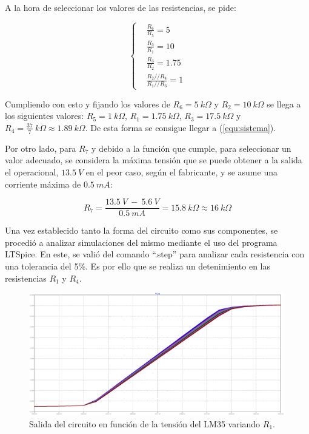A la hora de seleccionar los valores de las resistencias, se pide:

\begin{equation*}
\left\{
\begin{aligned}
  		&	\frac{R_6}{R_5} = 5	\\
  		&	\frac{R_3}{R_1} = 10	\\
  		&	\frac{R_3}{R_2} = 1.75	\\
  		&	\frac{R_2 // R_4}{R_1 // R_3} = 1
\end{aligned}
\right.
\end{equation*}

Cumpliendo con esto y fijando los valores de $R_6 = 5 \ k\Omega$ y $R_2 = 10 \ k\Omega$ se llega a los siguientes valores: $R_5 = 1 \ k\Omega$, $R_1 = 1.75 \ k\Omega$, $R_3 = 17.5 \ k\Omega$ y $R_4 = \frac{37}{7} \ k\Omega \approx 1.89 \ k\Omega$. De esta forma se consigue llegar a (\ref{equ:sistema}).

Por otro lado, para $R_7$ y debido a la función que cumple, para seleccionar un valor adecuado, se considera la máxima tensión que se puede obtener a la salida el operacional, $13.5 \ V$ en el peor caso, según el fabricante, y se asume una corriente máxima de $0.5 \ mA$:

\begin{equation}
	R_7 = \frac{13.5 \ V \ - \ 5.6 \ V}{0.5 \ mA} = 15.8 \ k\Omega \approx 16 \ k\Omega
	\label{equ:rzener}
\end{equation}

Una vez establecido tanto la forma del circuito como sus componentes, se procedió a analizar simulaciones del mismo mediante el uso del programa LTSpice. En este, se valió del comando ``.step'' para analizar cada resistencia con una tolerancia del 5\%. Es por ello que se realiza un detenimiento en las resistencias $R_1$ y $R_4$.

\begin{figure}[H]
	\centering
	\includegraphics[width=0.99\textwidth]{Ejercicio6/Imagenes/StepR1-M1.png}
	\caption{Salida del circuito en función de la tensión del LM35 variando $R_1$.}
	\label{fig:r1-M1}
\end{figure}

